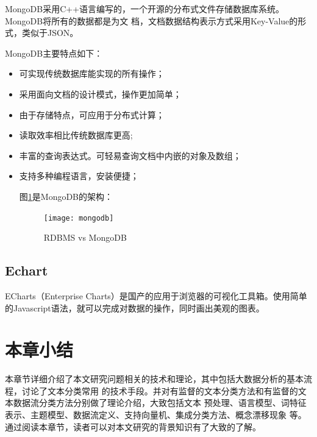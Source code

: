 MongoDB采用C++语言编写的，一个开源的分布式文件存储数据库系统。MongoDB将所有的数据都是为文
档，文档数据结构表示方式采用Key-Value的形式，类似于JSON。

MongoDB主要特点如下：
\begin{itemize}
\item 可实现传统数据库能实现的所有操作；
\item 采用面向文档的设计模式，操作更加简单；
\item 由于存储特点，可应用于分布式计算；
\item 读取效率相比传统数据库更高;
\item 丰富的查询表达式。可轻易查询文档中内嵌的对象及数组；
\item 支持多种编程语言，安装便捷；

  图\ref{fig:mongodb}是MongoDB的架构：
  \begin{figure}
  \centering
  \texttt{[image: mongodb]}
  \caption{RDBMS vs MongoDB\cite{beginnersbook.com}}
  \label{fig:mongodb}
\end{figure}
\end{itemize}

\subsection{Echart}
ECharts（Enterprise Charts）是国产的应用于浏览器的可视化工具箱。使用简单的Javascript语法，就可以完成对数据的操作，同时画出美观的图表。

\section{本章小结}
本章节详细介绍了本文研究问题相关的技术和理论，其中包括大数据分析的基本流程，讨论了文本分类常用
的技术手段。并对有监督的文本分类方法和有监督的文本数据流分类方法分别做了理论介绍，大致包括文本
预处理、语言模型、词特征表示、主题模型、数据流定义、支持向量机、集成分类方法、概念漂移现象
等。通过阅读本章节，读者可以对本文研究的背景知识有了大致的了解。

